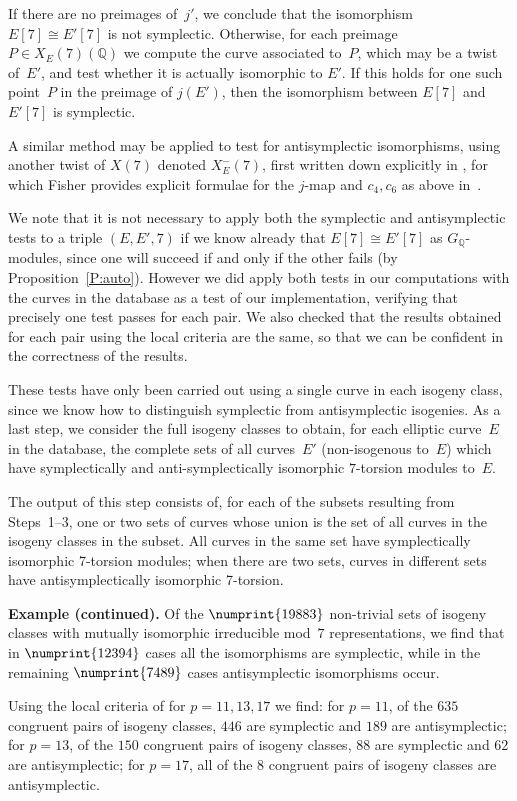 \documentclass[12pt]{amsart}
\newcommand{\Q}{\mathbb{Q}}
\numberwithin{equation}{section}
\theoremstyle{definition}
\theoremstyle{remark}
\begin{document}
If there are no preimages of~$j'$, we conclude that the isomorphism
$E[7]\cong E'[7]$ is not symplectic.  Otherwise, for each preimage
$P\in X_E(7)(\Q)$ we compute the curve associated to~$P$, which may be
a twist of~$E'$, and test whether it is actually isomorphic to $E'$.
If this holds for one such point~$P$ in the preimage of $j(E')$, then
the isomorphism between $E[7]$ and $E'[7]$ is symplectic.

A similar method may be applied to test for antisymplectic
isomorphisms, using another twist of $X(7)$ denoted $X_E^-(7)$, first
written down explicitly in \cite{PSS}, for which Fisher provides
explicit formulae for the $j$-map and $c_4,c_6$ as above
in~\cite{Fisher}.

We note that it is not necessary to apply both the symplectic and
antisymplectic tests to a triple $(E,E',7)$ if we know already that
$E[7]\cong E'[7]$ as $G_\Q$-modules, since one will succeed if and only if the other
fails (by Proposition~\ref{P:auto}).  However we did apply both
tests in our computations with the curves in the database as a test of
our implementation, verifying that precisely one test passes for each
pair.  We also checked that the results obtained for each pair using
the local criteria are the same, so that we can be confident in the
correctness of the results.

These tests have only been carried out using a single curve in each
isogeny class, since we know how to distinguish symplectic from
antisymplectic isogenies.  As a last step, we consider the full isogeny classes
to obtain, for each elliptic curve~$E$ in the database, the complete sets of all curves~$E'$ (non-isogenous to~$E$) which have
symplectically and anti-symplectically isomorphic $7$-torsion modules to~$E$.

The output of this step consists of, for each of the subsets resulting
from Steps~1--3, one or two sets of curves whose union is the set of
all curves in the isogeny classes in the subset.  All curves in the
same set have symplectically isomorphic 7-torsion modules; when there
are two sets, curves in different sets have antisymplectically
isomorphic 7-torsion.

{\bf Example (continued).}
Of the $\numprint{19883}$ non-trivial sets of isogeny classes with mutually
isomorphic irreducible mod~$7$ representations, we find that in
$\numprint{12394}$ cases all the isomorphisms are symplectic, while in the
remaining $\numprint{7489}$ cases antisymplectic isomorphisms occur.

Using the local criteria of \cite{FKSym} for $p=11, 13, 17$ we find:
for $p=11$, of the $635$ congruent pairs of isogeny classes, $446$ are
symplectic and $189$ are antisymplectic; for $p=13$, of the $150$
congruent pairs of isogeny classes, $88$ are symplectic and $62$ are
antisymplectic; for $p=17$, all of the $8$ congruent pairs of isogeny
classes are antisymplectic.
\end{document}

